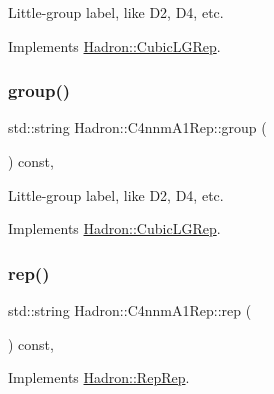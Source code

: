 Little-\/group label, like D2, D4, etc. 

Implements \mbox{\hyperlink{structHadron_1_1CubicLGRep_a9bdb14b519a611d21379ed96a3a9eb41}{Hadron\+::\+Cubic\+L\+G\+Rep}}.

\mbox{\label{structHadron_1_1C4nnmA1Rep_a327b4756034037f9a38a5944d4f98d22}} 
\subsubsection{\texorpdfstring{group()}{group()}\hspace{0.1cm}{\footnotesize\ttfamily [3/3]}}
{\footnotesize\ttfamily std\+::string Hadron\+::\+C4nnm\+A1\+Rep\+::group (\begin{DoxyParamCaption}{ }\end{DoxyParamCaption}) const\hspace{0.3cm}{\ttfamily [inline]}, {\ttfamily [virtual]}}

Little-\/group label, like D2, D4, etc. 

Implements \mbox{\hyperlink{structHadron_1_1CubicLGRep_a9bdb14b519a611d21379ed96a3a9eb41}{Hadron\+::\+Cubic\+L\+G\+Rep}}.

\mbox{\label{structHadron_1_1C4nnmA1Rep_a9d7705f3d1e605e81c8c5a603bffb361}} 
\subsubsection{\texorpdfstring{rep()}{rep()}\hspace{0.1cm}{\footnotesize\ttfamily [1/3]}}
{\footnotesize\ttfamily std\+::string Hadron\+::\+C4nnm\+A1\+Rep\+::rep (\begin{DoxyParamCaption}{ }\end{DoxyParamCaption}) const\hspace{0.3cm}{\ttfamily [inline]}, {\ttfamily [virtual]}}



Implements \mbox{\hyperlink{structHadron_1_1RepRep_ab3213025f6de249f7095892109575fde}{Hadron\+::\+Rep\+Rep}}.

\mbox{\label{structHadron_1_1C4nnmA1Rep_a9d7705f3d1e605e81c8c5a603bffb361}} 
